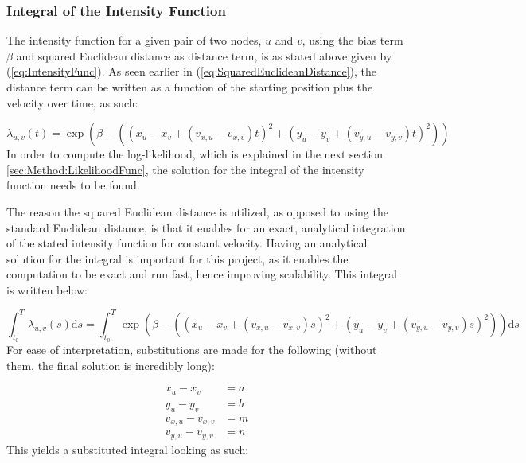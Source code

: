 
\subsubsection{Integral of the Intensity Function}
\label{sec:Method:IntensityFunc:IntegralIntensityFunc}
The intensity function for a given pair of two nodes, $u$ and $v$, using the bias term $\beta$ and squared Euclidean distance as distance term, is as stated above given by (\ref{eq:IntensityFunc}).
As seen earlier in (\ref{eq:SquaredEuclideanDistance}), the distance term can be written as a function of the starting position plus the velocity over time, as such:

\begin{equation}
    \lambda_{u,v}(t)
    =
    \exp \left(\beta - \left((x_u - x_v + (v_{x,u} - v_{x,v})t)^2 + (y_u - y_v + ( v_{y,u} - v_{y,v})t)^2\right)\right)
\end{equation}
In order to compute the log-likelihood, which is explained in the next section \ref{sec:Method:LikelihoodFunc}, the solution for the integral of the intensity function needs to be found. 

The reason the squared Euclidean distance is utilized, as opposed to using the standard Euclidean distance, is that it enables for an exact, analytical integration of the stated intensity function for constant velocity.
Having an analytical solution for the integral is important for this project, as it enables the computation to be exact and run fast, hence improving scalability.
This integral is written below:

\begin{equation}
    \int_{t_0}^T \lambda_{u,v}(s) \mathrm{d}s 
    =
    \int_{t_0}^T \exp \left(\beta - \left((x_u - x_v + (v_{x,u} - v_{x,v})s)^2 + (y_u - y_v + ( v_{y,u} - v_{y,v})s)^2\right)\right) \mathrm{d}s
\end{equation}
For ease of interpretation, substitutions are made for the following (without them, the final solution is incredibly long):

\begin{align}
    x_u - x_v &= a
    \\
    y_u - y_v &= b
    \\
    v_{x,u} - v_{x,v} &= m
    \\
    v_{y,u} - v_{y,v} &= n
\end{align}
This yields a substituted integral looking as such:

